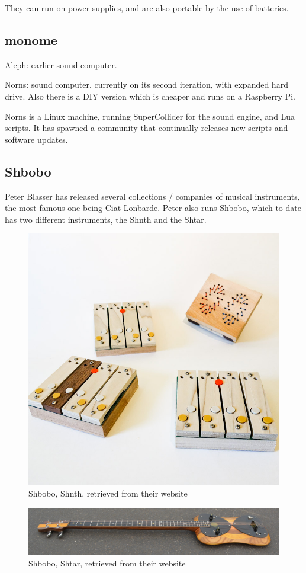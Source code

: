 They can run on power supplies, and are also portable by the use of batteries.

\subsection{monome}

Aleph: earlier sound computer.

Norns: sound computer, currently on its second iteration, with expanded hard drive. Also there is a DIY version which is cheaper and runs on a Raspberry Pi.

Norns is a Linux machine, running SuperCollider for the sound engine, and Lua scripts. It has spawned a community that continually releases new scripts and software updates.

\subsection{Shbobo}

Peter Blasser has released several collections / companies of musical instruments, the most famous one being Ciat-Lonbarde. Peter also runs Shbobo, which to date has two different instruments, the Shnth and the Shtar.

\begin{figure}[h]
  \centering
  \includegraphics[width=0.75\linewidth,height=0.25\textheight,keepaspectratio]{images/shbobo-shnth.jpg}
  \caption{Shbobo, Shnth, retrieved from their website}
  \label{fig:shbobo-shnth}
\end{figure}

\begin{figure}[h]
  \centering
    \includegraphics[width=0.75\linewidth,height=0.25\textheight,keepaspectratio]{images/shbobo-shtar.jpg}
  \caption{Shbobo, Shtar, retrieved from their website}
  \label{fig:shbobo-shtar}
\end{figure}

